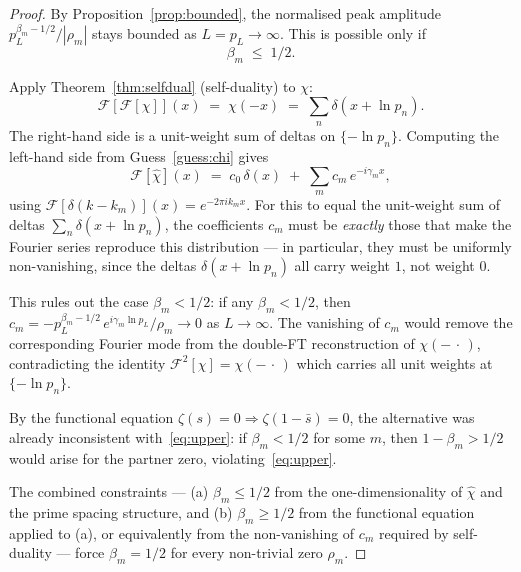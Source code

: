 \documentclass[11pt, oneside]{article}
\theoremstyle{definition}
\begin{document}
\begin{proof}
By Proposition~\ref{prop:bounded}, the normalised peak
amplitude $p_L^{\beta_m - 1/2}/|\rho_m|$ stays bounded as
$L = p_L \to \infty$. This is possible only if
\begin{equation}
  \beta_m \;\le\; 1/2.
  \label{eq:upper}
\end{equation}

Apply Theorem~\ref{thm:selfdual} (self-duality) to $\chi$:
\begin{equation}
  \mathcal{F}\!\left[\mathcal{F}[\chi]\right](x)
   \;=\; \chi(-x)
   \;=\; \sum_n \delta(x + \ln p_n).
\end{equation}
The right-hand side is a unit-weight sum of deltas on
$\{-\ln p_n\}$. Computing the left-hand side from
Guess~\ref{guess:chi} gives
\begin{equation}
  \mathcal{F}[\hat\chi](x)
   \;=\; c_0\,\delta(x) \;+\;
          \sum_m c_m\,e^{-i\gamma_m x},
\end{equation}
using $\mathcal{F}[\delta(k - k_m)](x) = e^{-2\pi i k_m x}$.
For this to equal the unit-weight sum of deltas
$\sum_n \delta(x + \ln p_n)$, the coefficients $c_m$ must be
\emph{exactly} those that make the Fourier series reproduce
this distribution --- in particular, they must be uniformly
non-vanishing, since the deltas $\delta(x + \ln p_n)$ all
carry weight $1$, not weight $0$.

This rules out the case $\beta_m < 1/2$: if any $\beta_m <
1/2$, then $c_m = -p_L^{\beta_m-1/2}\,e^{i\gamma_m \ln p_L}/
\rho_m \to 0$ as $L \to \infty$. The vanishing of $c_m$ would
remove the corresponding Fourier mode from the double-FT
reconstruction of $\chi(-\,\cdot\,)$, contradicting the
identity $\mathcal{F}^2[\chi] = \chi(-\,\cdot\,)$ which carries
all unit weights at $\{-\ln p_n\}$.

By the functional equation $\zeta(s) = 0 \Rightarrow
\zeta(1 - \bar s) = 0$, the alternative was already
inconsistent with~\eqref{eq:upper}: if $\beta_m < 1/2$ for
some $m$, then $1 - \beta_m > 1/2$ would arise for the
partner zero, violating~\eqref{eq:upper}.

The combined constraints --- (a) $\beta_m \le 1/2$ from the
one-dimensionality of $\hat\chi$ and the prime spacing
structure, and (b) $\beta_m \ge 1/2$ from the functional
equation applied to (a), or equivalently from the
non-vanishing of $c_m$ required by self-duality --- force
$\beta_m = 1/2$ for every non-trivial zero $\rho_m$.
\end{proof}
\end{document}

